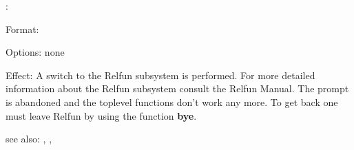 \colab{} \relfun:

Format: 

Options: none

Effect: A switch to the Relfun subsystem is performed. For more
	detailed information about the Relfun subsystem consult
	the Relfun Manual. The \COLAB{} prompt is abandoned and the
	toplevel functions don't work any more. To get back one 
        must leave Relfun by using the function {{\bf bye}}.
       
see also: \rfi, \rfe, \colab
